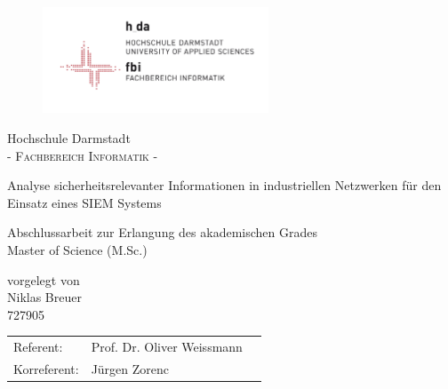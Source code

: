 \pagestyle{empty} %

\begin{figure}[t]
	\centering
	\includegraphics[width=0.6\textwidth]{Abb/logo_fbi}
\end{figure}


\begin{center}
\Large Hochschule Darmstadt \\
\normalsize \textsc{- Fachbereich Informatik -} \\

\vspace{85 pt}

\Huge Analyse sicherheitsrelevanter Informationen in industriellen Netzwerken für den Einsatz eines SIEM Systems \\ 
\normalsize
\vspace{20 pt}

Abschlussarbeit zur Erlangung des akademischen Grades \\ 
Master of Science (M.Sc.) 

\vspace{55 pt}


vorgelegt von \\
\vspace{5 pt}
Niklas Breuer\\
727905
\vspace{85 pt}

\begin{tabular}[h]{p{4cm}l l}
	Referent: & Prof. Dr. Oliver Weissmann\\
	Korreferent: & Jürgen Zorenc
\end{tabular}


\end{center}